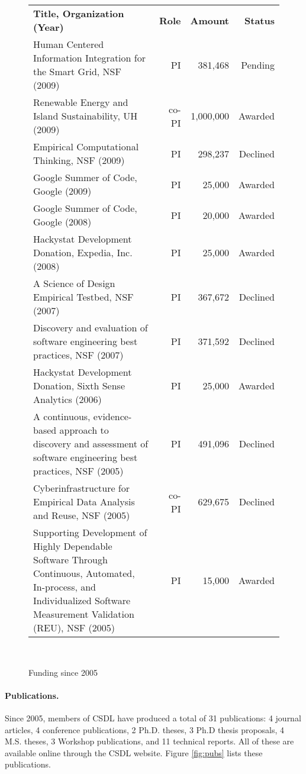 \documentclass[11pt]{article}
\begin{document}
\begin{figure}[ht]
\small
\begin{tabular}{p{4.5in}rrr} \hline
{\bf Title, Organization (Year)} & {\bf Role} & {\bf Amount} & {\bf Status} \\
Human Centered Information Integration for the Smart Grid, NSF (2009) & PI & 381,468 & Pending \\
Renewable Energy and Island Sustainability, UH (2009) & co-PI & 1,000,000 & Awarded  \\
Empirical Computational Thinking, NSF (2009) & PI & 298,237 & Declined \\
Google Summer of Code, Google (2009) & PI & 25,000 & Awarded \\
Google Summer of Code, Google (2008) & PI & 20,000 & Awarded \\
Hackystat Development Donation, Expedia, Inc. (2008) & PI & 25,000 & Awarded \\
A Science of Design Empirical Testbed, NSF (2007) & PI & 367,672 & Declined \\
Discovery and evaluation of software engineering best practices, NSF (2007) & PI & 371,592 & Declined \\
Hackystat Development Donation, Sixth Sense Analytics (2006) & PI & 25,000 & Awarded \\
A continuous, evidence-based approach to discovery and assessment of software engineering best practices, NSF (2005) & PI & 491,096 & Declined\\
Cyberinfrastructure for Empirical Data Analysis and Reuse, NSF (2005) & co-PI & 629,675 & Declined \\
Supporting Development of Highly Dependable Software Through Continuous, Automated, In-process, and Individualized Software Measurement Validation (REU), NSF (2005) & PI & 15,000 & Awarded \\ \hline
\end{tabular} \\ 
\normalsize
\caption{Funding since 2005}
\label{fig:funding}
\end{figure}



\paragraph{Publications.}  Since 2005, members of CSDL have produced a total of 31 publications: 4 journal articles, 4 conference publications, 2 Ph.D. theses, 3 Ph.D thesis proposals, 4 M.S. theses, 3 Workshop publications, and 11 technical reports.  All of these are available online through the CSDL website.  Figure \ref{fig:pubs} lists these publications. 
\end{document}
